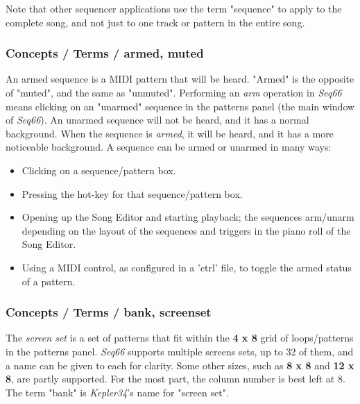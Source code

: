   Note that other sequencer applications use the term "sequence"
   to apply to the complete song, and not just to one track or pattern in the
   entire song.

\subsubsection{Concepts / Terms / armed, muted}
\label{subsubsec:concepts_terms_armed}

   An armed sequence is a MIDI pattern that will be heard.
   "Armed" is the opposite of "muted", and the same as "unmuted".
   Performing an \textsl{arm} operation in \textsl{Seq66}
   means clicking on an "unarmed" sequence in the patterns panel (the main
   window of \textsl{Seq66}).
   An unarmed sequence will not be heard, and it has a normal background.
   When the sequence is \textsl{armed}, it will be heard, and it has a
   more noticeable  background.
   A sequence can be armed or unarmed in many ways:

   \begin{itemize}
      \item Clicking on a sequence/pattern box.
      \item Pressing the hot-key for that sequence/pattern box.
      \item Opening up the Song Editor and starting playback; the
         sequences arm/unarm depending on the layout of the
         sequences and triggers in the piano roll of the Song Editor.
      \item Using a MIDI control, as configured in a 'ctrl' file, to
         toggle the armed status of a pattern.
   \end{itemize}

\subsubsection{Concepts / Terms / bank, screenset}
\label{subsubsec:concepts_terms_bank}

   The \textsl{screen set}
   is a set of patterns that fit within the \textbf{4 x 8}
   grid of loops/patterns in the patterns panel.
   \textsl{Seq66} supports multiple screens sets, up to 32 of them,
   and a name can be given to each for clarity.
   Some other sizes, such as \textbf{8 x 8} and \textbf{12 x 8}, are
   partly supported.  For the most part, the column number is best left at 8.
   The term "bank" is \textsl{Kepler34}'s name for "screen set".

